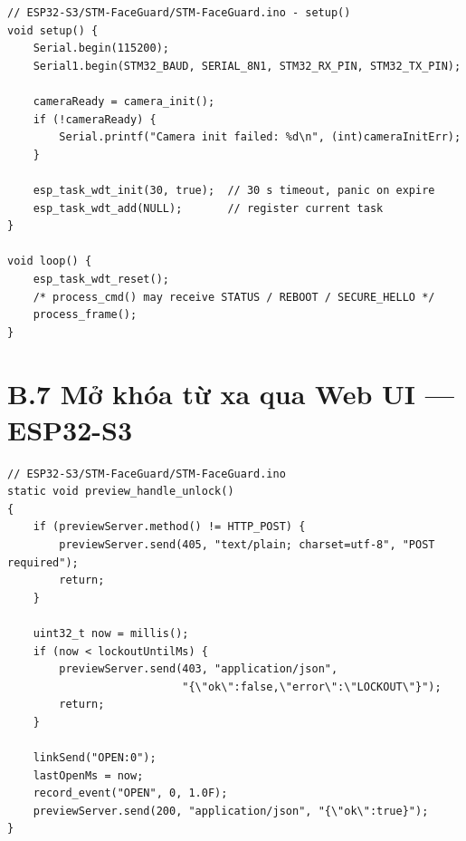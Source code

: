 \begin{lstlisting}[style=cstyle,
  caption={Task Watchdog (Task WDT) ESP32-S3 - 30s timeout},
  label={lst:esp_task_wdt}]
// ESP32-S3/STM-FaceGuard/STM-FaceGuard.ino - setup()
void setup() {
    Serial.begin(115200);
    Serial1.begin(STM32_BAUD, SERIAL_8N1, STM32_RX_PIN, STM32_TX_PIN);
    
    cameraReady = camera_init();
    if (!cameraReady) {
        Serial.printf("Camera init failed: %d\n", (int)cameraInitErr);
    }

    esp_task_wdt_init(30, true);  // 30 s timeout, panic on expire
    esp_task_wdt_add(NULL);       // register current task
}

void loop() {
    esp_task_wdt_reset();
    /* process_cmd() may receive STATUS / REBOOT / SECURE_HELLO */
    process_frame();
}
\end{lstlisting}

\section*{B.7 \quad Mở khóa từ xa qua Web UI --- ESP32-S3}

\begin{lstlisting}[style=cstyle,
  caption={Endpoint \texttt{/unlock} chuyển lệnh HTTP thành \texttt{OPEN:0}},
  label={lst:web_unlock}]
// ESP32-S3/STM-FaceGuard/STM-FaceGuard.ino
static void preview_handle_unlock()
{
    if (previewServer.method() != HTTP_POST) {
        previewServer.send(405, "text/plain; charset=utf-8", "POST required");
        return;
    }

    uint32_t now = millis();
    if (now < lockoutUntilMs) {
        previewServer.send(403, "application/json",
                           "{\"ok\":false,\"error\":\"LOCKOUT\"}");
        return;
    }

    linkSend("OPEN:0");
    lastOpenMs = now;
    record_event("OPEN", 0, 1.0F);
    previewServer.send(200, "application/json", "{\"ok\":true}");
}
\end{lstlisting}
